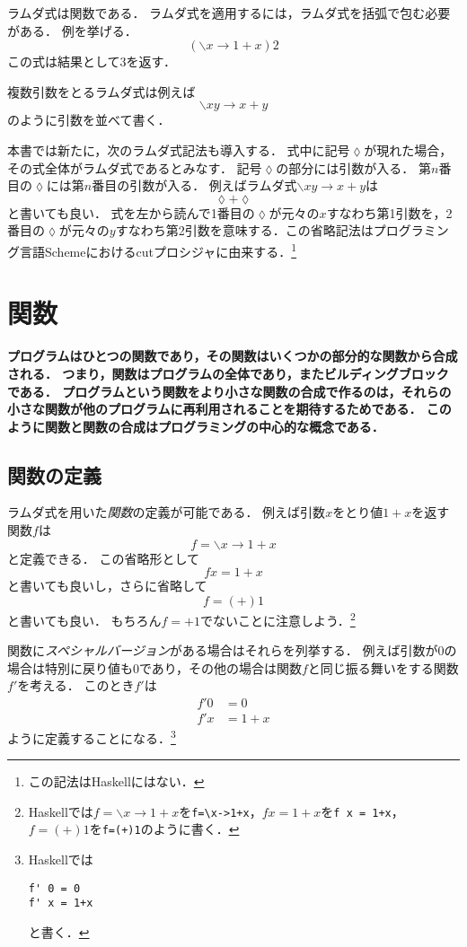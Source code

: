 \documentclass[twocolumn]{jsbook}
\newcommand{\keyword}[1]{\emph{#1}}
\newcommand{\code}[1]{\texttt{#1}}
\newenvironment{leader}{\begingroup\bf}{\endgroup}
\newcommand{\lambdasym}{\backslash}
\newcommand{\lambdadot}{\rightarrow}
\newcommand{\lambdaexp}[2]{\lambdasym#1\lambdadot#2}
\newcommand{\lambdacut}{\lozenge}
\begin{document}
ラムダ式は関数である．
ラムダ式を適用するには，ラムダ式を括弧で包む必要がある．
例を挙げる．
$$\left(\lambdaexp{x}{1+x}\right)2$$
この式は結果として$3$を返す．

複数引数をとるラムダ式は例えば$$\lambdaexp{xy}{x+y}$$のように引数を並べて書く．

本書では新たに，次のラムダ式記法も導入する．
式中に記号$\lambdacut$が現れた場合，その式全体がラムダ式であるとみなす．
記号$\lambdacut$の部分には引数が入る．
第$n$番目の$\lambdacut$には第$n$番目の引数が入る．
例えばラムダ式$\lambdaexp{xy}{x+y}$は$$\lambdacut+\lambdacut$$と書いても良い．
式を左から読んで1番目の$\lambdacut$が元々の$x$すなわち第1引数を，2番目の$\lambdacut$が元々の$y$すなわち第2引数を意味する．この省略記法はプログラミング言語Schemeにおけるcutプロシジャに由来する．\footnote{この記法はHaskellにはない．}

\chapter{関数}

\begin{leader}
プログラムはひとつの関数であり，その関数はいくつかの部分的な関数から合成される．
つまり，関数はプログラムの全体であり，またビルディングブロックである．
プログラムという関数をより小さな関数の合成で作るのは，それらの小さな関数が他のプログラムに再利用されることを期待するためである．
このように関数と関数の合成はプログラミングの中心的な概念である．
\end{leader}


\section{関数の定義}

ラムダ式を用いた\keyword{関数}の定義が可能である．
例えば引数$x$をとり値$1+x$を返す関数$f$は$$f=\lambdaexp{x}{1+x}$$と定義できる．
この省略形として$$fx=1+x$$と書いても良いし，さらに省略して$$f=(+)1$$と書いても良い．
もちろん$f=+1$でないことに注意しよう．\footnote{Haskellでは$f=\lambdaexp{x}{1+x}$を\code{f=\textbackslash x->1+x}，$fx=1+x$を\code{f x = 1+x}，$f=(+)1$を\code{f=(+)1}のように書く．}

関数に\keyword{スペシャルバージョン}がある場合はそれらを列挙する．
例えば引数が$0$の場合は特別に戻り値も$0$であり，その他の場合は関数$f$と同じ振る舞いをする関数$f'$を考える．
このとき$f'$は
\begin{equation*}
\begin{split}
f'0&=0\\
f'x&=1+x
\end{split}
\end{equation*}
ように定義することになる．\footnote{Haskellでは
\begin{verbatim}
f' 0 = 0
f' x = 1+x
\end{verbatim}
と書く．}
\end{document}
